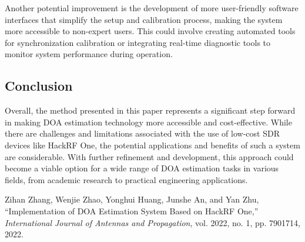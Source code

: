 \documentclass{article}
\begin{document}
Another potential improvement is the development of more user-friendly software interfaces that simplify the setup and calibration process, making the system more accessible to non-expert users. This could involve creating automated tools for synchronization calibration or integrating real-time diagnostic tools to monitor system performance during operation.

\subsection{Conclusion}

Overall, the method presented in this paper represents a significant step forward in making DOA estimation technology more accessible and cost-effective. While there are challenges and limitations associated with the use of low-cost SDR devices like HackRF One, the potential applications and benefits of such a system are considerable. With further refinement and development, this approach could become a viable option for a wide range of DOA estimation tasks in various fields, from academic research to practical engineering applications.




\begin{thebibliography}{9}

Zihan Zhang, Wenjie Zhao, Yonghui Huang, Junshe An, and Yan Zhu, 
``Implementation of DOA Estimation System Based on HackRF One,''
\textit{International Journal of Antennas and Propagation}, 
vol. 2022, no. 1, pp. 7901714, 2022.

\end{thebibliography}
\end{document}
